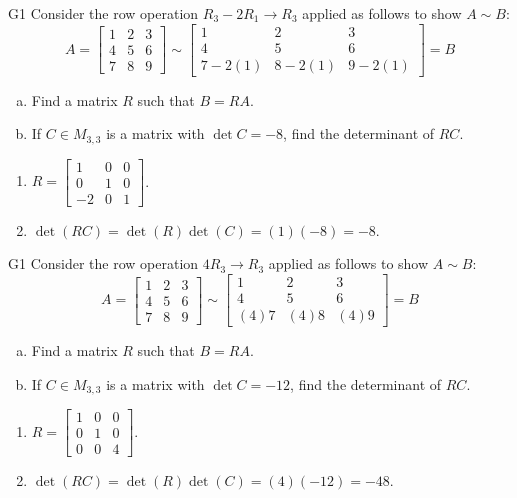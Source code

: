 \begin{problem}{G1}
Consider the row operation \(R_3-2R_1\to R_3\) applied as follows to show
\(A\sim B\):
\[
A=\begin{bmatrix}1&2&3\\4&5&6\\7&8&9\end{bmatrix}
  \sim
\begin{bmatrix}1&2&3\\4&5&6\\7-2(1)&8-2(1)&9-2(1)\end{bmatrix}=B
\]
\begin{enumerate}[(a)]
\item Find a matrix \(R\) such that \(B=RA\).
\item If \(C \in M_{3,3}\) is a matrix with \(\det C = -8\), find the determinant of \(RC\).
\end{enumerate}
\end{problem}
\begin{solution}
\begin{enumerate}
\item \(R= \begin{bmatrix} 1 & 0 & 0 \\ 0 & 1 & 0 \\ -2 & 0 & 1 \end{bmatrix}\).
\item \(\det(RC)= \det(R)\det(C)=(1)(-8)=-8\).
\end{enumerate}
\end{solution}

\begin{problem}{G1}
Consider the row operation \(4R_3\to R_3\) applied as follows to show
\(A\sim B\):
\[
A=\begin{bmatrix}1&2&3\\4&5&6\\7&8&9\end{bmatrix}
  \sim
\begin{bmatrix}1&2&3\\4&5&6\\(4)7&(4)8&(4)9\end{bmatrix}=B
\]
\begin{enumerate}[(a)]
\item Find a matrix \(R\) such that \(B=RA\).
\item If \(C \in M_{3,3}\) is a matrix with \(\det C = -12\), find the determinant of \(RC\).
\end{enumerate}
\end{problem}
\begin{solution}
\begin{enumerate}
\item \(R= \begin{bmatrix} 1 & 0 & 0 \\ 0 & 1 & 0 \\ 0 & 0 & 4 \end{bmatrix}\).
\item \(\det(RC)= \det(R)\det(C)=(4)(-12)=-48\).
\end{enumerate}
\end{solution}

